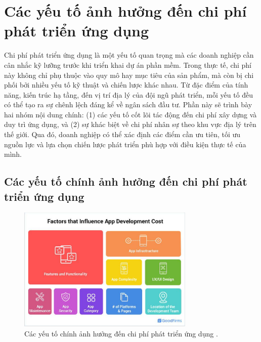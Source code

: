 \section{Các yếu tố ảnh hưởng đến chi phí phát triển ứng dụng}

  \hspace*{0.8cm}Chi phí phát triển ứng dụng là một yếu tố quan trọng mà các doanh nghiệp cần cân nhắc kỹ lưỡng trước khi triển khai dự án phần mềm. Trong thực tế, chi phí này không chỉ phụ thuộc vào quy mô hay mục tiêu của sản phẩm, mà còn bị chi phối bởi nhiều yếu tố kỹ thuật và chiến lược khác nhau. Từ đặc điểm của tính năng, kiến trúc hạ tầng, đến vị trí địa lý của đội ngũ phát triển, mỗi yếu tố đều có thể tạo ra sự chênh lệch đáng kể về ngân sách đầu tư. Phần này sẽ trình bày hai nhóm nội dung chính: (1) các yếu tố cốt lõi tác động đến chi phí xây dựng và duy trì ứng dụng, và (2) sự khác biệt về chi phí nhân sự theo khu vực địa lý trên thế giới. Qua đó, doanh nghiệp có thể xác định các điểm cần ưu tiên, tối ưu nguồn lực và lựa chọn chiến lược phát triển phù hợp với điều kiện thực tế của mình.
  \vspace{0.5em}
  
  
\subsection{Các yếu tố chính ảnh hưởng đến chi phí phát triển ứng dụng}
\renewcommand{\labelitemi}{--}  

  \begin{figure}[H]
    \centering
    \includegraphics[width=0.75\textwidth]{images/appCosst.png}
    \caption{Các yếu tố chính ảnh hưởng đến chi phí phát triển ứng dụng \cite{goodfirmsAppCost}.}
    \label{fig:fig20}
  \end{figure}

